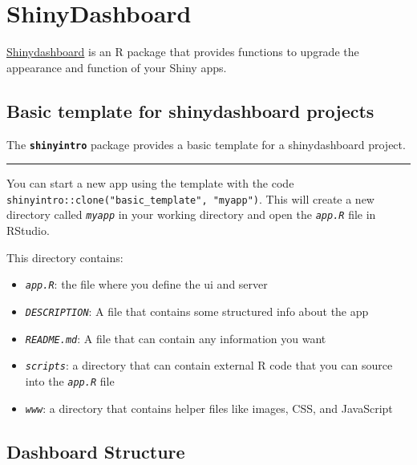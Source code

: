 \documentclass[
  oneside]{book}
\providecommand{\tightlist}{%
  \setlength{\itemsep}{0pt}\setlength{\parskip}{0pt}}
\begin{document}
\hypertarget{shinydashboard}{%
\chapter{ShinyDashboard}\label{shinydashboard}}

\href{https://rstudio.github.io/shinydashboard/}{Shinydashboard} is an R package that provides functions to upgrade the appearance and function of your Shiny apps.

\hypertarget{basic-template-for-shinydashboard-projects}{%
\section{Basic template for shinydashboard projects}\label{basic-template-for-shinydashboard-projects}}

The \textbf{\texttt{shinyintro}} package provides a basic template for a shinydashboard project.

\begin{center}\rule{0.5\linewidth}{0.5pt}\end{center}

You can start a new app using the template with the code \texttt{shinyintro::clone("basic\_template",\ "myapp")}. This will create a new directory called \textit{\texttt{myapp}} in your working directory and open the \textit{\texttt{app.R}} file in RStudio.

This directory contains:

\begin{itemize}
\tightlist
\item
  \textit{\texttt{app.R}}: the file where you define the ui and server
\item
  \textit{\texttt{DESCRIPTION}}: A file that contains some structured info about the app
\item
  \textit{\texttt{README.md}}: A file that can contain any information you want
\item
  \textit{\texttt{scripts}}: a directory that can contain external R code that you can source into the \textit{\texttt{app.R}} file
\item
  \textit{\texttt{www}}: a directory that contains helper files like images, CSS, and JavaScript
\end{itemize}

\hypertarget{dashboard-structure}{%
\section{Dashboard Structure}\label{dashboard-structure}}
\end{document}
